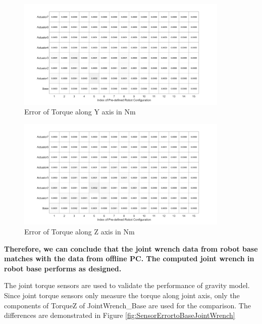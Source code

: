 \begin{figure}[H]
	\begin{center}
		\includegraphics[width=0.9\textwidth]{./images/TorqueYErrorFB.png}%
		\caption{Error of Torque along Y axis in Nm}
		\label{fig:TorqueYErrorFB}%
	\end{center}
\end{figure}

\begin{figure}[H]
	\begin{center}
		\includegraphics[width=0.9\textwidth]{./images/TorqueZErrorFB.png}%
		\caption{Error of Torque along Z axis in Nm}
		\label{fig:TorqueZErrorFB}%
	\end{center}
\end{figure}

\textbf{Therefore, we can conclude that the joint wrench data from robot base matches with the data from offline PC. The computed joint wrench in robot base performs as designed.}


The joint torque sensors are used to validate the performance of gravity model. Since joint torque sensors only measure the torque along joint axis, only the components of TorqueZ of JointWrench\_Base are used for the comparison. The differences are demonstrated in Figure \ref{fig:SensorErrortoBaseJointWrench}

